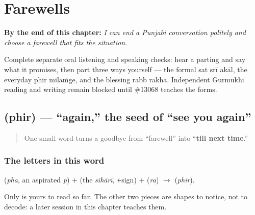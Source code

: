 
\chapter{Farewells}
\label{ch:farewells}

\begin{chapteropening}
\textbf{By the end of this chapter:} \emph{I can end a Punjabi conversation politely and choose a farewell that fits the situation.}

Complete separate oral listening and speaking checks: hear a parting and say what it promises, then part three ways yourself — the formal sat srī akāl, the everyday phir milāṁge, and the blessing rabb rākhā. Independent Gurmukhi reading and writing remain blocked until \#13068 teaches the forms.
\end{chapteropening}

\section[\texorpdfstring{\pa{ਫਿਰ} (phir)}{ਫਿਰ (phir)}]{ (phir) — \textquotedblleft{}again,\textquotedblright{} the seed of \textquotedblleft{}see you again\textquotedblright{}}

\label{lesson:PA-C04-phir}



\begin{quote}
One small word turns a goodbye from \textquotedblleft{}farewell\textquotedblright{} into \textquotedblleft{}\textbf{till next time}.\textquotedblright{}
\end{quote}

\subsection*{The letters in this word}
\textbf{} (\emph{pha}, an aspirated \emph{p}) + \textbf{} (the \emph{sihārī}, \emph{i}-sign) + \textbf{} (\emph{ra}) $\to$ \textbf{} (\emph{phir}).

Only \textbf{} is yours to read so far. The other two pieces are shapes to notice, not to decode: a later session in this chapter teaches them.

